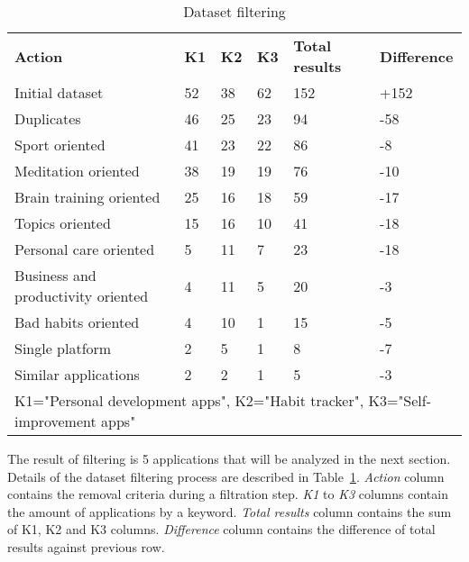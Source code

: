 \begin{table}[t!]
    \centering
    \begin{adjustbox}{width=\textwidth}
        \begin{ctucolortab}
            \begin{tabular}{llllll}
                \bfseries Action & \bfseries K1 & \bfseries K2 & \bfseries K3 & \bfseries Total results & \bfseries Difference \\\Midrule
                Initial dataset & 52 & 38 & 62  & 152 & +152\\
                Duplicates & 46 & 25 & 23  & 94 & -58\\
                Sport oriented & 41 & 23 & 22  & 86 & -8\\
                Meditation oriented & 38 & 19 & 19  & 76 & -10\\
                Brain training oriented & 25 & 16 & 18  & 59 & -17\\
                Topics oriented & 15 & 16 & 10  & 41 & -18\\
                Personal care oriented & 5 & 11 & 7  & 23 & -18\\
                Business and productivity oriented & 4 & 11 & 5  & 20 & -3\\
                Bad habits oriented & 4 & 10 & 1  & 15 & -5\\
                Single platform & 2 & 5 & 1  & 8 & -7\\
                Similar applications & 2 & 2 & 1  & 5 & -3\\
                \bottomrule
                \multicolumn{6}{1}{K1="Personal development apps", K2="Habit tracker", K3="Self-improvement apps"}
            \end{tabular}
        \end{ctucolortab}
    \end{adjustbox}
    \caption{Dataset filtering}
    \label{tab:dataset-filtering}
\end{table}

The result of filtering is 5 applications that will be analyzed in the next section.
Details of the dataset filtering process are described in Table~\ref{tab:dataset-filtering}.
\textit{Action} column contains the removal criteria during a filtration step.
\textit{K1} to \textit{K3} columns contain the amount of applications by a keyword.
\textit{Total results} column contains the sum of K1, K2 and K3 columns.
\textit{Difference} column contains the difference of total results against previous row.